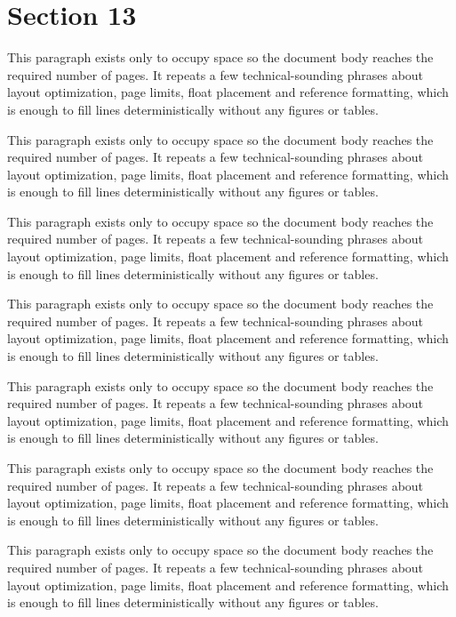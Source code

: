 \documentclass[10pt,letterpaper]{article}
\begin{document}
\section{Section 13}
This paragraph exists only to occupy space so the document body reaches the required number of pages. It repeats a few technical-sounding phrases about layout optimization, page limits, float placement and reference formatting, which is enough to fill lines deterministically without any figures or tables.

This paragraph exists only to occupy space so the document body reaches the required number of pages. It repeats a few technical-sounding phrases about layout optimization, page limits, float placement and reference formatting, which is enough to fill lines deterministically without any figures or tables.

This paragraph exists only to occupy space so the document body reaches the required number of pages. It repeats a few technical-sounding phrases about layout optimization, page limits, float placement and reference formatting, which is enough to fill lines deterministically without any figures or tables.

This paragraph exists only to occupy space so the document body reaches the required number of pages. It repeats a few technical-sounding phrases about layout optimization, page limits, float placement and reference formatting, which is enough to fill lines deterministically without any figures or tables.

This paragraph exists only to occupy space so the document body reaches the required number of pages. It repeats a few technical-sounding phrases about layout optimization, page limits, float placement and reference formatting, which is enough to fill lines deterministically without any figures or tables.

This paragraph exists only to occupy space so the document body reaches the required number of pages. It repeats a few technical-sounding phrases about layout optimization, page limits, float placement and reference formatting, which is enough to fill lines deterministically without any figures or tables.

This paragraph exists only to occupy space so the document body reaches the required number of pages. It repeats a few technical-sounding phrases about layout optimization, page limits, float placement and reference formatting, which is enough to fill lines deterministically without any figures or tables.
\end{document}
